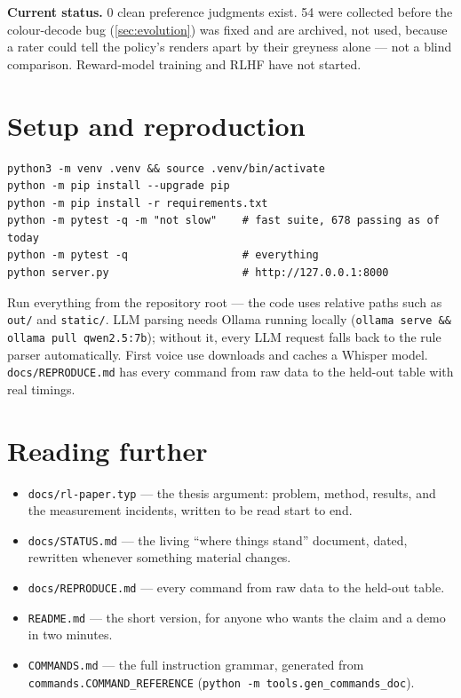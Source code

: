 \documentclass[10pt]{article}
\newcommand{\status}[1]{\begin{findingbox}[colframe=black!30]\textbf{Current status.} #1\end{findingbox}}
\newcommand{\code}[1]{\texttt{#1}}
\begin{document}
\status{0 clean preference judgments exist. 54 were collected before the
colour-decode bug (\cref{sec:evolution}) was fixed and are archived, not
used, because a rater could tell the policy's renders apart by their
greyness alone --- not a blind comparison. Reward-model training and RLHF
have not started.}

\newpage
\section{Setup and reproduction}

\begin{lstlisting}
python3 -m venv .venv && source .venv/bin/activate
python -m pip install --upgrade pip
python -m pip install -r requirements.txt
python -m pytest -q -m "not slow"    # fast suite, 678 passing as of today
python -m pytest -q                  # everything
python server.py                     # http://127.0.0.1:8000
\end{lstlisting}

Run everything from the repository root --- the code uses relative paths
such as \code{out/} and \code{static/}. LLM parsing needs Ollama running
locally (\code{ollama serve \&\& ollama pull qwen2.5:7b}); without it, every
LLM request falls back to the rule parser automatically. First voice use
downloads and caches a Whisper model. \code{docs/REPRODUCE.md} has every
command from raw data to the held-out table with real timings.

\section*{Reading further}

\begin{itemize}[itemsep=2pt, topsep=2pt]
\item \code{docs/rl-paper.typ} --- the thesis argument: problem, method,
  results, and the measurement incidents, written to be read start to end.
\item \code{docs/STATUS.md} --- the living ``where things stand'' document,
  dated, rewritten whenever something material changes.
\item \code{docs/REPRODUCE.md} --- every command from raw data to the held-out table.
\item \code{README.md} --- the short version, for anyone who wants the claim
  and a demo in two minutes.
\item \code{COMMANDS.md} --- the full instruction grammar, generated from
  \code{commands.COMMAND\_REFERENCE} (\code{python -m tools.gen\_commands\_doc}).
\end{itemize}
\end{document}
